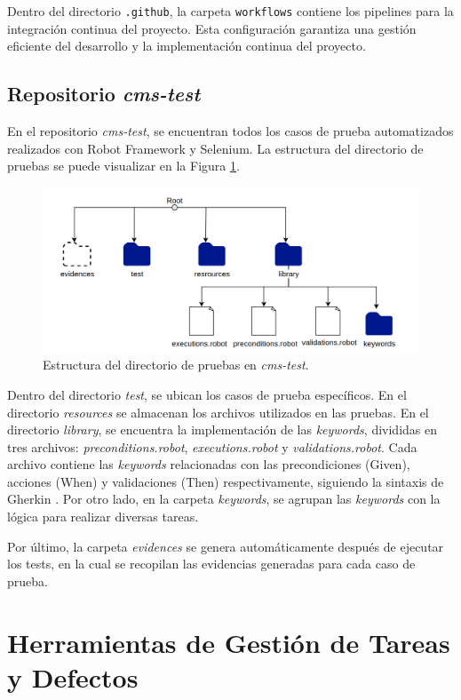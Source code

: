 Dentro del directorio \texttt{.github}, la carpeta \texttt{workflows} contiene los pipelines para la integración continua del proyecto. Esta configuración garantiza una gestión eficiente del desarrollo y la implementación continua del proyecto.


\subsection{Repositorio \textit{cms-test}}
En el repositorio \textit{cms-test}, se encuentran todos los casos de prueba automatizados realizados con Robot Framework y Selenium.
La estructura del directorio de pruebas se puede visualizar en la Figura \ref{fig:test-directory}. 

\begin{figure}[H]
\centering
\includegraphics[width=0.9\linewidth]{fig/test-directory.png}
\caption{Estructura del directorio de pruebas en \textit{cms-test}.}
\label{fig:test-directory}
\end{figure}

Dentro del directorio \textit{test}, se ubican los casos de prueba específicos. En el directorio \textit{resources} se almacenan los archivos utilizados en las pruebas. En el directorio \textit{library}, se encuentra la implementación de las \textit{keywords}, divididas en tres archivos: \textit{preconditions.robot}, \textit{executions.robot} y \textit{validations.robot}. Cada archivo contiene las \textit{keywords} relacionadas con las precondiciones (Given), acciones (When) y validaciones (Then) respectivamente, siguiendo la sintaxis de Gherkin \cite{gherkin_docs}.
Por otro lado, en la carpeta \textit{keywords}, se agrupan las \textit{keywords} con la lógica para realizar diversas tareas.

Por último, la carpeta \textit{evidences} se genera automáticamente después de ejecutar los tests, en la cual se recopilan las evidencias generadas para cada caso de prueba.

\section{Herramientas de Gestión de Tareas y Defectos}


